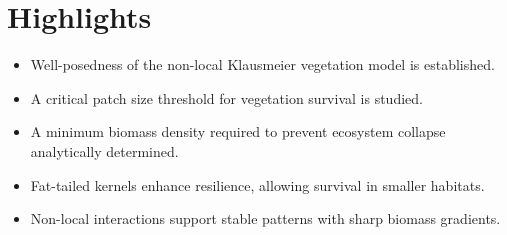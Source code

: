 \documentclass{article}
\begin{document}
\section*{Highlights}

\begin{itemize}
  \item Well-posedness of the non-local Klausmeier vegetation model is established.
  \item A critical patch size threshold for vegetation survival is studied.
  \item A minimum biomass density required to prevent ecosystem collapse analytically determined.
  \item Fat-tailed kernels enhance resilience, allowing survival in smaller habitats.
  \item Non-local interactions support stable patterns with sharp biomass gradients.
\end{itemize}
\end{document}
